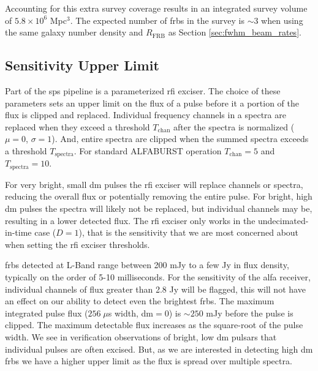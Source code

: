 \documentclass[a4paper,fleqn,usenatbib]{mnras}
\begin{document}
Accounting for this extra survey coverage results in an integrated survey volume
of $5.8 \times 10^6$ Mpc$^3$. The expected number of \glspl{frb} in the survey is
$\sim 3$ when using the same galaxy number density and $R_{\textrm{FRB}}$ as
Section \ref{sec:fwhm_beam_rates}.

\subsection{Sensitivity Upper Limit}
\label{sec:upper_limit}

Part of the \gls{sps} pipeline is a parameterized \gls{rfi} exciser. The choice
of these parameters sets an upper limit on the flux of a pulse before it a
portion of the flux is clipped and replaced. Individual frequency channels in a
spectra are replaced when they exceed a threshold $T_{\textrm{chan}}$ after the
spectra is normalized ($\mu=0$, $\sigma=1$). And, entire spectra are clipped
when the summed spectra exceeds a threshold $T_{\textrm{spectra}}$. For standard
ALFABURST operation $T_{\textrm{chan}} = 5$ and $T_{\textrm{spectra}} = 10$.

For very bright, small \gls{dm} pulses the \gls{rfi} exciser will replace
channels or spectra, reducing the overall flux or potentially removing the
entire pulse.  For bright, high \gls{dm} pulses the spectra will likely not be
replaced, but individual channels may be, resulting in a lower detected flux.
The \gls{rfi} exciser only works in the undecimated-in-time case ($D=1$), that
is the sensitivity that we are most concerned about when setting the \gls{rfi}
exciser thresholds.

\glspl{frb} detected at L-Band range between 200 mJy to a few Jy in flux
density, typically on the order of 5-10 milliseconds. For the sensitivity of the
\gls{alfa} receiver, individual channels of flux greater than 2.8 Jy will be
flagged, this will not have an effect on our ability to detect even the
brightest \glspl{frb}.  The maximum integrated pulse flux ($256 \; \mu$s width,
\gls{dm}$=0$) is $\sim250$ mJy before the pulse is clipped. The maximum
detectable flux increases as the square-root of the pulse width.  We see in
verification observations of bright, low \gls{dm} pulsars that individual
pulses are often excised. But, as we are interested in detecting high \gls{dm}
\glspl{frb} we have a higher upper limit as the flux is spread over multiple
spectra.
\end{document}
